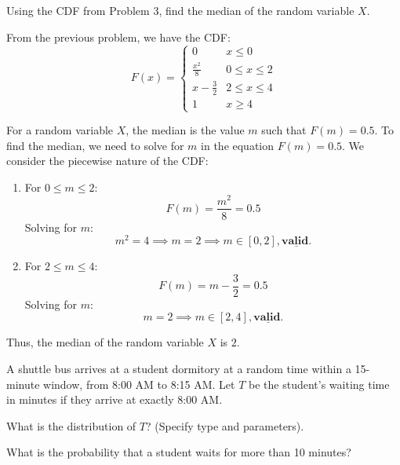 \documentclass[a4paper, 10pt]{article}
\begin{document}
\begin{problem}
Using the CDF from Problem 3, find the median of the random variable \( X \).
\end{problem}

\begin{solution}
From the previous problem, we have the CDF:
\[
F(x) = \begin{cases}
    0 & x \leq 0 \\
    \frac{x^2}{8} & 0 \leq x \leq 2 \\
    x - \frac{3}{2} & 2 \leq x \leq 4 \\
    1 & x \geq 4
\end{cases}
\]

For a random variable \( X \), the median is the value \( m \) such that \( F(m) = 0.5 \).
To find the median, we need to solve for \( m \) in the equation \( F(m) = 0.5 \).
We consider the piecewise nature of the CDF:
\begin{enumerate}
    \item For \( 0 \leq m \leq 2 \):
    \[
    F(m) = \frac{m^2}{8} = 0.5
    \]
    Solving for \( m \):
    \[
    m^2 = 4 \implies m = 2 \implies m \in [0, 2], \underline{\textbf{valid.}}
    \]
    
    \item For \( 2 \leq m \leq 4 \):
    \[
    F(m) = m - \frac{3}{2} = 0.5
    \]
    Solving for \( m \):
    \[
    m = 2 \implies m \in [2, 4], \underline{\textbf{valid.}}
    \]
\end{enumerate}

Thus, the median of the random variable \( X \) is \( \boxed{2} \).
\end{solution}


\begin{problem}
A shuttle bus arrives at a student dormitory at a random time within a 15-minute window, from 8:00 AM to 8:15 AM.
Let \( T \) be the student's waiting time in minutes if they arrive at exactly 8:00 AM.
\begin{subproblems}
    \item What is the distribution of \( T \)? (Specify type and parameters).
    \item What is the probability that a student waits for more than 10 minutes?
\end{subproblems}
\end{problem}
\end{document}
